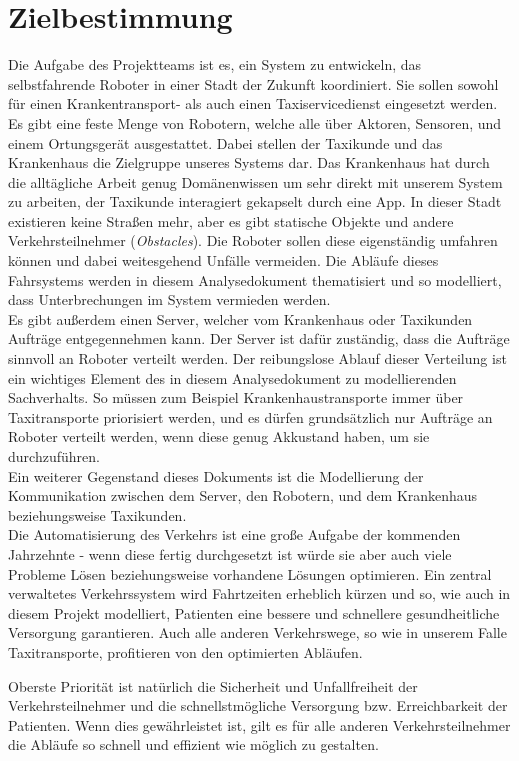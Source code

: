 
\section{Zielbestimmung}
Die Aufgabe des Projektteams ist es, ein System zu entwickeln, das selbstfahrende Roboter in einer Stadt der Zukunft koordiniert. 
Sie sollen sowohl für einen Krankentransport- als auch einen Taxiservicedienst eingesetzt werden. \\
Es gibt eine feste Menge von Robotern, welche alle über Aktoren, Sensoren, und einem Ortungsgerät ausgestattet. Dabei stellen der Taxikunde und das Krankenhaus die Zielgruppe unseres Systems dar. 
Das Krankenhaus hat durch die alltägliche Arbeit genug Domänenwissen um sehr direkt mit unserem System zu arbeiten, der Taxikunde interagiert gekapselt durch eine App.
In dieser Stadt existieren keine Straßen mehr, aber es gibt statische Objekte und andere Verkehrsteilnehmer (\textit{Obstacles}). 
Die Roboter sollen diese  eigenständig umfahren können und dabei weitesgehend Unfälle vermeiden. 
Die Abläufe dieses Fahrsystems werden in diesem Analysedokument thematisiert und so modelliert, dass Unterbrechungen im System vermieden werden.\\ 
Es gibt außerdem einen Server, welcher vom Krankenhaus oder Taxikunden Aufträge entgegennehmen kann. 
Der Server ist dafür zuständig, dass die Aufträge sinnvoll an Roboter verteilt werden. 
Der reibungslose Ablauf dieser Verteilung ist ein wichtiges Element des in diesem Analysedokument zu modellierenden Sachverhalts. 
So müssen zum Beispiel Krankenhaustransporte immer über Taxitransporte priorisiert werden, und es dürfen grundsätzlich nur Aufträge an Roboter verteilt werden, wenn diese genug Akkustand haben, um sie durchzuführen.\\
Ein weiterer Gegenstand dieses Dokuments ist die Modellierung der Kommunikation zwischen dem Server, den Robotern, und dem Krankenhaus beziehungsweise Taxikunden.\\

Die Automatisierung des Verkehrs ist eine große Aufgabe der kommenden Jahrzehnte - wenn diese fertig durchgesetzt ist würde sie aber auch viele Probleme Lösen beziehungsweise vorhandene Lösungen optimieren. Ein zentral verwaltetes Verkehrssystem wird Fahrtzeiten erheblich kürzen und so, wie auch in diesem Projekt modelliert, Patienten eine bessere und schnellere gesundheitliche Versorgung garantieren. Auch alle anderen Verkehrswege, so wie in unserem Falle Taxitransporte, profitieren von den optimierten Abläufen.

Oberste Priorität ist natürlich die Sicherheit und Unfallfreiheit der Verkehrsteilnehmer und die schnellstmögliche Versorgung bzw. Erreichbarkeit der Patienten. Wenn dies gewährleistet ist, gilt es für alle anderen Verkehrsteilnehmer die Abläufe so schnell und effizient wie möglich zu gestalten.\\


\pagebreak
